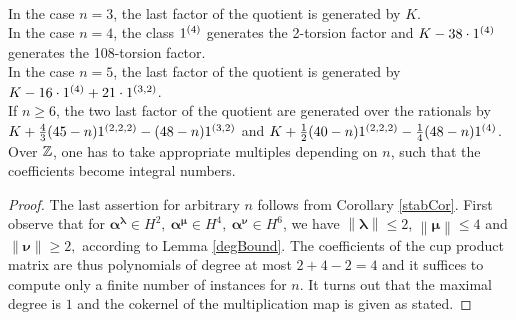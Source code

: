 \begin{proposition}
\begin{align*}
\end{align*} 
In the case $n=3$, the last factor of the quotient is generated by $K$. 
\\In the case $n=4$, the class $ 1^{(4)}$ generates the 2-torsion factor and $K-38\cdot1^{(4)}$ generates the 108-torsion factor.
\\In the case $n=5$, the last factor of the quotient is generated by $K - 16\cdot 1^{(4)} + 21\cdot 1^{(3,2)}$.\\
If $n\geq 6$, the two last factor of the quotient are generated over the rationals by $K +\frac{4}{3}(45-n)1^{(2,2,2)} - (48-n)1^{(3,2)}$ and $K+\frac{1}{2}(40-n)1^{(2,2,2)}- \frac{1}{4}(48-n)1^{(4)}$. Over $\mathbb{Z}$, one has to take appropriate multiples depending on $n$, such that the coefficients become integral numbers.
\end{proposition}
\begin{proof} The last assertion for arbitrary $n$ follows from Corollary \ref{stabCor}. First observe that for $\boldsymbol{\alpha}^{\boldsymbol{\lambda}}\!\in\! H^2,\  \boldsymbol{\alpha}^{\boldsymbol{\mu}}\!\in\! H^4,\  \boldsymbol{\alpha}^{\boldsymbol{\nu}}\!\in\! H^6 $, we have $\left\| \boldsymbol\lambda\right\| \leq 2$, $\left\| \boldsymbol\mu\right\| \leq 4$ and $\left\| \boldsymbol\nu\right\| \geq 2,$ according to Lemma \ref{degBound}.
The coefficients of the cup product matrix are thus polynomials of degree at most $2+4-2 =4$ and it suffices to compute only a finite number of instances for $n$. It turns out that the maximal degree is $1$ and the cokernel of the multiplication map is given as stated.
\end{proof}

